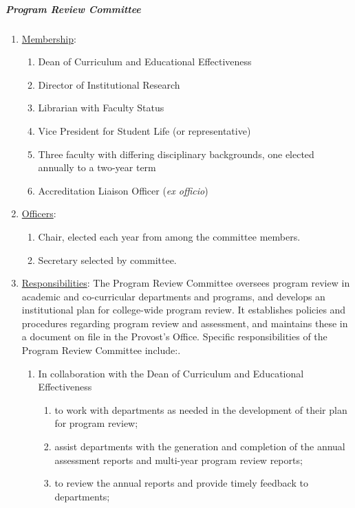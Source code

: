 				\subparagraph{Program Review Committee}
					\begin{enumerate}[label=\alph*)]
						\item{\underline{Membership}:
							\begin{enumerate}[label=\arabic*)]
								\item{Dean of Curriculum and Educational Effectiveness}
								\item{Director of Institutional Research}
								\item{Librarian with Faculty Status}
								\item{Vice President for Student Life (or representative)}
								\item{Three faculty with differing disciplinary backgrounds, one elected annually to a two-year term}
								\item{Accreditation Liaison Officer (\emph{ex
										officio})}
							\end{enumerate}
						}
						\item{\underline{Officers}:
							\begin{enumerate}[label=\arabic*)]
								\item{Chair, elected each year from among the committee members.}
								\item{Secretary selected by committee.}
							\end{enumerate}
						}
						\item{\underline{Responsibilities}:
							The Program Review Committee oversees program review in academic and co-curricular departments and programs, and develops an institutional plan for college-wide program review.  It establishes policies and procedures regarding program review and assessment, and maintains these in a document on file in the Provost's Office.  Specific responsibilities of the Program Review Committee include:.
							\begin{enumerate}[label=\arabic*)]
								\item{In collaboration with the Dean of Curriculum and Educational Effectiveness
									\begin{enumerate}[label=(\alph*)]
										\item{to work with departments as needed in the development of their plan for program review;}
										\item{assist departments with the generation and completion of the annual assessment reports and multi-year program review reports;}
										\item{to review the annual reports and provide timely feedback to departments;}

\end{enumerate}}
\end{enumerate}}
\end{enumerate}
